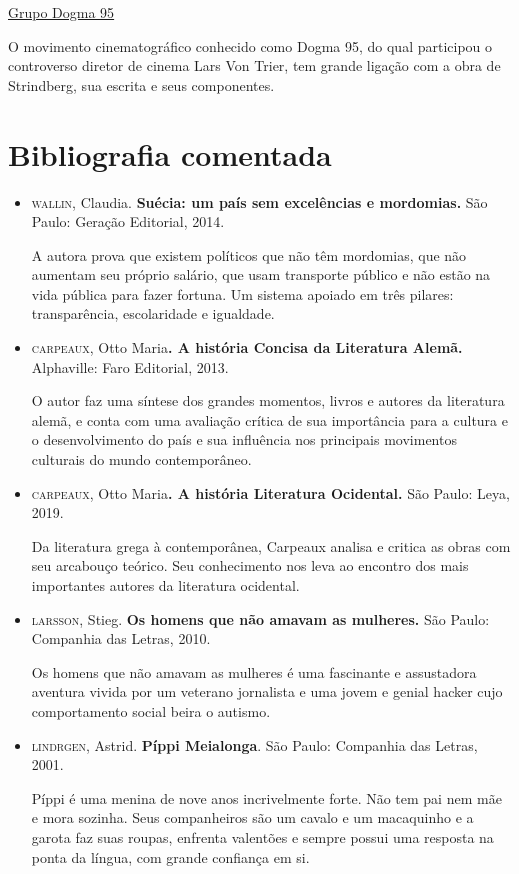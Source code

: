 \documentclass[12pt]{extarticle}
\begin{document}
\href{https://www.institutodecinema.com.br/mais/conteudo/movimentos-do-cinema-o-que-foi-o-dogma-95}{Grupo Dogma 95} 

O movimento cinematográfico conhecido como Dogma 95, do qual participou 
o controverso diretor de cinema Lars Von Trier, tem grande ligação com a obra de Strindberg, 
sua escrita e seus componentes.

\section{Bibliografia comentada}

\begin{itemize}
\item\textsc{wallin}, Claudia. \textbf{Suécia: um país sem excelências e mordomias.}
São Paulo: Geração Editorial, 2014.

A autora prova que existem políticos que não têm mordomias, que não
aumentam seu próprio salário, que usam transporte público e não estão na
vida pública para fazer fortuna. Um sistema apoiado em três pilares:
transparência, escolaridade e igualdade.

\item\textsc{carpeaux}, Otto Maria\textbf{. A história Concisa da Literatura Alemã.}
Alphaville: Faro Editorial, 2013.

O autor faz uma síntese dos grandes momentos, livros e autores da
literatura alemã, e conta com uma avaliação crítica de sua importância
para a cultura e o desenvolvimento do país e sua influência nos
principais movimentos culturais do mundo contemporâneo.

\item\textsc{carpeaux}, Otto Maria\textbf{. A história Literatura Ocidental.} São
Paulo: Leya, 2019.

Da literatura grega à contemporânea, Carpeaux analisa e critica as obras
com seu arcabouço teórico. Seu conhecimento nos leva ao encontro dos
mais importantes autores da literatura ocidental.

\item\textsc{larsson}, Stieg. \textbf{Os homens que não amavam as mulheres.} São
Paulo: Companhia das Letras, 2010.

Os homens que não amavam as mulheres é uma fascinante e assustadora
aventura vivida por um veterano jornalista e uma jovem e genial hacker
cujo comportamento social beira o autismo.

\item\textsc{lindrgen}, Astrid. \textbf{Píppi Meialonga}. São Paulo: Companhia das
Letras, 2001.

Píppi é uma menina de nove anos incrivelmente forte. Não tem pai nem mãe
e mora sozinha. Seus companheiros são um cavalo e um macaquinho e a
garota faz suas roupas, enfrenta valentões e sempre possui uma resposta
na ponta da língua, com grande confiança em si.


\end{itemize}
\end{document}
